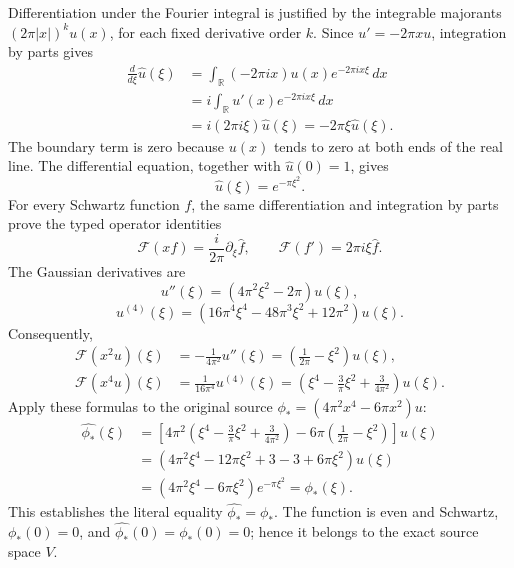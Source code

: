 Differentiation under the Fourier integral is justified by the integrable
majorants \((2\pi|x|)^k u(x)\), for each fixed derivative order \(k\).
Since \(u'=-2\pi xu\), integration by parts gives
\[
\begin{aligned}
\frac{d}{d\xi}\widehat u(\xi)
 &=\int_{\mathbb R}(-2\pi ix)u(x)e^{-2\pi ix\xi}\,dx\\
 &=i\int_{\mathbb R}u'(x)e^{-2\pi ix\xi}\,dx\\
 &=i(2\pi i\xi)\widehat u(\xi)
 =-2\pi\xi\widehat u(\xi).
\end{aligned}
\]
The boundary term is zero because \(u(x)\) tends to zero at both
ends of the real line. The differential equation, together with
\(\widehat u(0)=1\), gives
\[
\widehat u(\xi)=e^{-\pi\xi^2}.
\]
For every Schwartz function \(f\), the same differentiation and integration
by parts prove the typed operator identities
\[
\mathcal F(xf)=\frac{i}{2\pi}\partial_\xi\widehat f,\qquad
\mathcal F(f')=2\pi i\xi\widehat f.
\]
The Gaussian derivatives are
\[
u''(\xi)=(4\pi^2\xi^2-2\pi)u(\xi),
\]
\[
u^{(4)}(\xi)=
(16\pi^4\xi^4-48\pi^3\xi^2+12\pi^2)u(\xi).
\]
Consequently,
\[
\begin{aligned}
\mathcal F(x^2u)(\xi)
 &=-\frac1{4\pi^2}u''(\xi)
   =\left(\frac1{2\pi}-\xi^2\right)u(\xi),\\
\mathcal F(x^4u)(\xi)
 &=\frac1{16\pi^4}u^{(4)}(\xi)
   =\left(\xi^4-\frac3\pi\xi^2+\frac3{4\pi^2}\right)u(\xi).
\end{aligned}
\]
Apply these formulas to the original source
\(\phi_*=(4\pi^2x^4-6\pi x^2)u\):
\[
\begin{aligned}
\widehat{\phi_*}(\xi)
 &=\left[
 4\pi^2\left(\xi^4-\frac3\pi\xi^2+\frac3{4\pi^2}\right)
 -6\pi\left(\frac1{2\pi}-\xi^2\right)\right]u(\xi)\\
 &=(4\pi^2\xi^4-12\pi\xi^2+3-3+6\pi\xi^2)u(\xi)\\
 &=(4\pi^2\xi^4-6\pi\xi^2)e^{-\pi\xi^2}
 =\phi_*(\xi).
\end{aligned}
\]
This establishes the literal equality
\(\widehat{\phi_*}=\phi_*\). The function is even and Schwartz,
\(\phi_*(0)=0\), and
\(\widehat{\phi_*}(0)=\phi_*(0)=0\); hence it belongs to the exact source
space \(V\).

